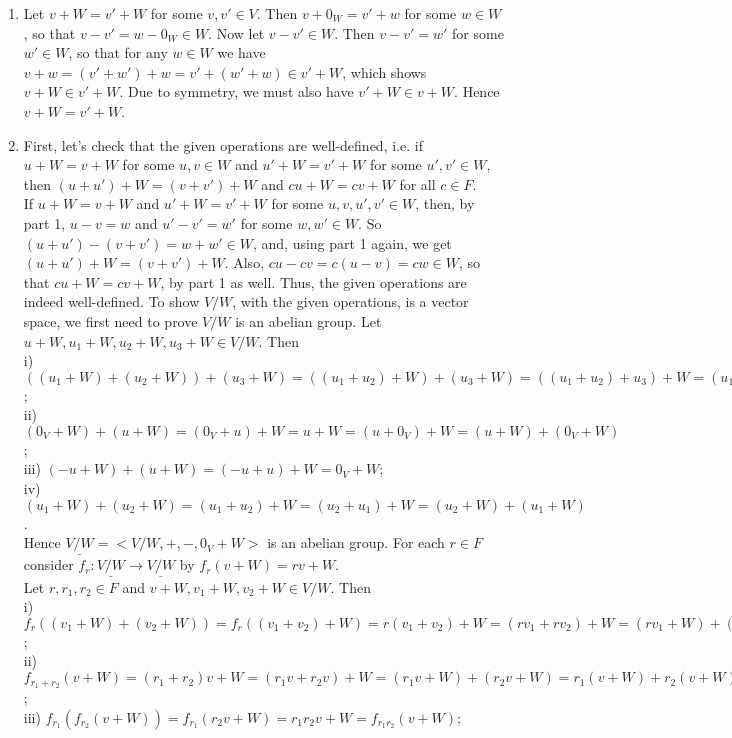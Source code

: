 \begin{solution}

\begin{enumerate}
\item Let $v+W = v'+W$ for some $v, v' \in V$. Then $v+0_W = v'+w$
for some $w \in W$, so that $v-v' = w-0_W \in W$.
\vskip2mm
Now let $v-v' \in W$. Then $v-v' = w'$ for some $w' \in W$, so that for
any $w \in W$ we have $v+w = (v'+w')+w = v'+(w'+w) \in v'+W$, which
shows $v+W \in v'+W$. Due to symmetry, we must also have $v'+W \in v+W$.
Hence $v+W = v'+W$.
\vskip2mm
\item First, let's check that the given operations are well-defined, i.e. if
$u+W = v+W$ for some $u,v \in W$ and $u'+W = v'+W$ for some $u',v' \in W$,
then $(u+u')+W = (v+v')+W$ and $cu+W = cv+W$ for all $c \in F$. \\
If $u+W = v+W$ and $u'+W = v'+W$ for some $u,v,u',v' \in W$, then, by part 1,
$u-v = w$ and $u'-v' = w'$ for some $w, w' \in W$. So $(u+u')-(v+v') = w+w' \in W$,
and, using part 1 again, we get $(u+u')+W = (v+v')+W$. Also, $cu-cv = c(u-v) = cw \in W$,
so that $cu+W = cv+W$, by part 1 as well. Thus, the given operations are indeed well-defined.
\vskip2mm
To show $V/W$, with the given operations, is a vector space, we first need to prove $V/W$
is an abelian group.
\vskip2mm
Let $u+W, u_1+W, u_2+W, u_3+W \in V/W$. Then \\
i) $((u_1+W)+(u_2+W))+(u_3+W) = ((u_1+u_2)+W)+(u_3+W) =
((u_1+u_2)+u_3)+W = (u_1+(u_2+u_3))+W = (u_1+W)+((u_2+u_3)+ W) =
(u_1+W)+((u_2+W)+(u_3+W))$; \\
ii) $(0_V+W)+(u+W) = (0_V+u)+W = u+W = (u+0_V)+W = (u+W)+(0_V+W)$; \\
iii) $(-u+W)+(u+W) = (-u+u)+W = 0_V+W$; \\
iv) $(u_1+W)+(u_2+W) = (u_1+u_2)+W = (u_2+u_1)+W = (u_2+W)+(u_1+W)$. \\
Hence $\underline{V/W}=<V/W,+,-,0_V+W>$ is an abelian group.
\vskip2mm
For each $r \in F$ consider $f_r: \underline{V/W} \rightarrow \underline{V/W}$ by $f_r(v+W)=rv+W$. \\
Let $r, r_1, r_2 \in F$ and $v+W, v_1+W, v_2+W \in V/W$. Then \\
i) $f_r((v_1+W)+(v_2+W))=f_r((v_1+v_2)+W)=r(v_1+v_2)+W=(rv_1+rv_2)+W=(rv_1+W)+(rv_2+W)=
r(v_1+W)+r(v_2+W)=f_r(v_1+W)+f_r(v_2+W)$; \\
ii) $f_{r_1+r_2}(v+W)=(r_1+r_2)v+W=(r_1v+r_2v)+W=(r_1v+W)+(r_2v+W)=r_1(v+W)+r_2(v+W)=
f_{r_1}(v+W)+f_{r_2}(v+W)$; \\
iii) $f_{r_1}(f_{r_2}(v+W))=f_{r_1}(r_2v+W)=r_1r_2v+W=f_{r_1r_2}(v+W)$; \\

\end{enumerate}
\end{solution}
